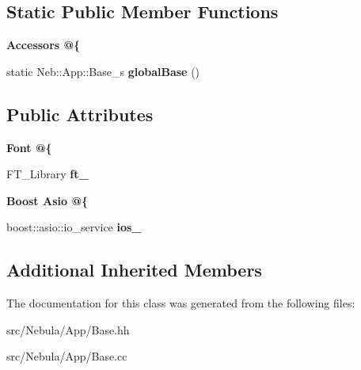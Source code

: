 \subsection*{Static Public Member Functions}
\begin{Indent}{\bf Accessors @\{}\par
\begin{DoxyCompactItemize}
\item 
\hypertarget{classNeb_1_1App_1_1Base_a07fbe923b685fd30e7a9e34473a8b67f}{static Neb\-::\-App\-::\-Base\-\_\-s {\bfseries global\-Base} ()}\label{classNeb_1_1App_1_1Base_a07fbe923b685fd30e7a9e34473a8b67f}

\end{DoxyCompactItemize}
\end{Indent}
\subsection*{Public Attributes}
\begin{Indent}{\bf Font @\{}\par
\begin{DoxyCompactItemize}
\item 
\hypertarget{classNeb_1_1App_1_1Base_a957424f530de5476709d7046653d7567}{F\-T\-\_\-\-Library {\bfseries ft\-\_\-}}\label{classNeb_1_1App_1_1Base_a957424f530de5476709d7046653d7567}

\end{DoxyCompactItemize}
\end{Indent}
\begin{Indent}{\bf Boost Asio @\{}\par
\begin{DoxyCompactItemize}
\item 
\hypertarget{classNeb_1_1App_1_1Base_a99c95783c97c8e34ad2fafd1806367e2}{boost\-::asio\-::io\-\_\-service {\bfseries ios\-\_\-}}\label{classNeb_1_1App_1_1Base_a99c95783c97c8e34ad2fafd1806367e2}

\end{DoxyCompactItemize}
\end{Indent}
\subsection*{Additional Inherited Members}


The documentation for this class was generated from the following files\-:\begin{DoxyCompactItemize}
\item 
src/\-Nebula/\-App/Base.\-hh\item 
src/\-Nebula/\-App/Base.\-cc\end{DoxyCompactItemize}
